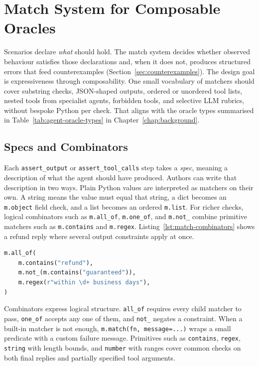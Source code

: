 \section{Match System for Composable Oracles}
\label{sec:match-system}

Scenarios declare \emph{what} should hold. The match system decides whether observed behaviour satisfies those declarations and, when it does not, produces structured errors that feed counterexamples (Section~\ref{sec:counterexamples}). The design goal is expressiveness through composability. One small vocabulary of matchers should cover substring checks, JSON-shaped outputs, ordered or unordered tool lists, nested tools from specialist agents, forbidden tools, and selective LLM rubrics, without bespoke Python per check. That aligns with the oracle types summarised in Table~\ref{tab:agent-oracle-types} in Chapter~\ref{chap:background}.

\subsection{Specs and Combinators}

Each \texttt{assert\_output} or \texttt{assert\_tool\_calls} step takes a \emph{spec}, meaning a description of what the agent should have produced. Authors can write that description in two ways. Plain Python values are interpreted as matchers on their own. A string means the value must equal that string, a dict becomes an \texttt{m.object} field check, and a list becomes an ordered \texttt{m.list}. For richer checks, logical combinators such as \texttt{m.all\_of}, \texttt{m.one\_of}, and \texttt{m.not\_} combine primitive matchers such as \texttt{m.contains} and \texttt{m.regex}. Listing~\ref{lst:match-combinators} shows a refund reply where several output constraints apply at once.

\begin{lstlisting}[language=Python,caption={Combining substring, negation, and regex constraints on one output.},label=lst:match-combinators]
m.all_of(
    m.contains("refund"),
    m.not_(m.contains("guaranteed")),
    m.regex(r"within \d+ business days"),
)
\end{lstlisting}

Combinators express logical structure. \texttt{all\_of} requires every child matcher to pass, \texttt{one\_of} accepts any one of them, and \texttt{not\_} negates a constraint. When a built-in matcher is not enough, \texttt{m.match(fn, message=...)} wraps a small predicate with a custom failure message. Primitives such as \texttt{contains}, \texttt{regex}, \texttt{string} with length bounds, and \texttt{number} with ranges cover common checks on both final replies and partially specified tool arguments.

